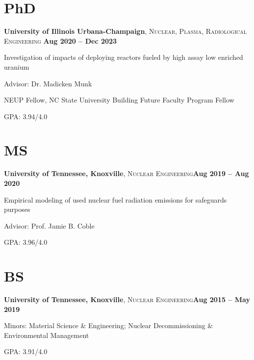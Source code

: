 \documentclass[margin,line]{resume}
\begin{document}
\begin{resume}
    \section{\mysidestyle PhD}
    \textbf{University of Illinois Urbana-Champaign}, \textsc{Nuclear, Plasma, Radiological Engineering}\hfill \textbf{ Aug 2020 -- Dec 2023}\vspace{-3mm}\\\vspace{-1mm}%
    \begin{list2}
        \item Investigation of impacts of deploying reactors fueled by high assay low enriched uranium
        \item Advisor: Dr. Madicken Munk
        \item NEUP Fellow, NC State University Building Future Faculty Program Fellow
        \item GPA: 3.94/4.0
    \end{list2}
    \section{\mysidestyle MS}
    \textbf{University of Tennessee, Knoxville}, \textsc{Nuclear Engineering}\hfill\textbf{Aug 2019 -- Aug 2020}\vspace{-3mm}\\\vspace{-1mm}%
    \begin{list2}
        \item Empirical modeling of used nuclear fuel radiation emissions for safeguards purposes
        \item Advisor: Prof. Jamie B. Coble
        \item GPA: 3.96/4.0
    \end{list2}
    \section{\mysidestyle BS}
    \textbf{University of Tennessee, Knoxville}, \textsc{Nuclear Engineering}\hfill\textbf{Aug 2015 -- May 2019}\vspace{-3mm}\\\vspace{-1mm}%
    \begin{list2}
        \item Minors: Material Science \& Engineering; Nuclear 
              Decommissioning \& Environmental Management
        \item GPA: 3.91/4.0
    \end{list2}
    

\end{resume}
\end{document}
